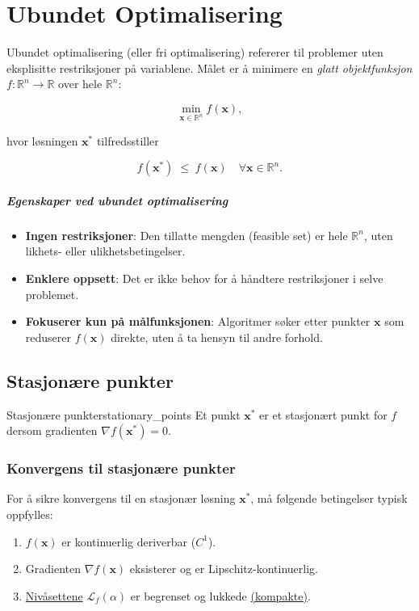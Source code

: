 \chapter{Ubundet Optimalisering}\label{chap:unconstrained_optimization}

Ubundet optimalisering (eller fri optimalisering) refererer til problemer uten eksplisitte restriksjoner på variablene.
Målet er å minimere en \textit{glatt objektfunksjon} \( f : \mathbb{R}^n \to \mathbb{R} \) over hele \(\mathbb{R}^n\):

\[
  \min_{\symbf{x} \in \mathbb{R}^n} f(\symbf{x}),
\]

hvor løsningen \(\symbf{x}^*\) tilfredsstiller

\[
  f(\symbf{x}^*) \;\le\; f(\symbf{x})
  \quad \forall \symbf{x} \in \mathbb{R}^n.
\]

\paragraph{Egenskaper ved ubundet optimalisering}

\begin{itemize}
  \item \textbf{Ingen restriksjoner}: Den tillatte mengden (feasible set) er hele \(\mathbb{R}^n\), uten likhets- eller ulikhetsbetingelser.
  \item \textbf{Enklere oppsett}: Det er ikke behov for å håndtere restriksjoner i selve problemet.
  \item \textbf{Fokuserer kun på målfunksjonen}: Algoritmer søker etter punkter \(\symbf{x}\) som reduserer \(f(\symbf{x})\) direkte, uten å ta hensyn til andre forhold.
\end{itemize}

\section{Stasjonære punkter}\label{sec:stationary_points}

\begin{definition}{Stasjonære punkter}{stationary_points}
  Et punkt \(\symbf{x}^*\) er et stasjonært punkt for \(f\) dersom gradienten \(\nabla f(\symbf{x}^*) = 0\).
\end{definition}

\subsection*{Konvergens til stasjonære punkter}
For å sikre konvergens til en stasjonær løsning \(\symbf{x}^*\), må følgende betingelser typisk oppfylles:
\begin{enumerate}
  \item \(f(\symbf{x})\) er kontinuerlig deriverbar (\(C^1\)).
  \item Gradienten \(\nabla f(\symbf{x})\) eksisterer og er Lipschitz-kontinuerlig.
  \item \hyperref[def:level_set]{Nivåsettene} \(\mathcal{L}_f(\alpha)\) er begrenset og lukkede \hyperref[def:compact_set]{(kompakte)}.
\end{enumerate}

